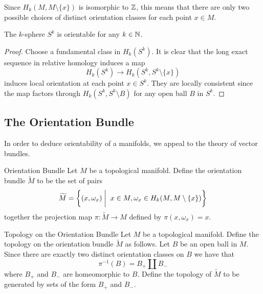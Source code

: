 \documentclass[a4paper]{article}
\begin{document}
Since $H_k(M,M\setminus\{x\})$ is isomorphic to $\mathbb{Z}$, this means that there are only two possible choices of distinct orientation classes for each point $x\in M$. 

\begin{lmm}{}{} The $k$-sphere $S^k$ is orientable for any $k\in\mathbb{N}$. \tcbline
\begin{proof}
Choose a fundamental class in $H_k(S^k)$. It is clear that the long exact sequence in relative homology induces a map $$H_k(S^k)\to H_k(S^k,S^k\setminus\{x\})$$ induces local orientation at each point $x\in S^k$. They are locally consistent since the map factors through $H_k(S^k,S^k\setminus B)$ for any open ball $B$ in $S^k$. 
\end{proof}
\end{lmm}

\subsection{The Orientation Bundle}
In order to deduce orientability of a manifolds, we appeal to the theory of vector bundles. 

\begin{defn}{Orientation Bundle}{} Let $M$ be a topological manifold. Define the orientation bundle $\widetilde{M}$ to be the set of pairs $$\widetilde{M}=\left\{(x,\omega_x)\;\bigg{|}\;\; x\in M, \omega_x\in H_k(M,M\setminus\{x\})\right\}$$ together the projection map $\pi:\widetilde{M}\to M$ defined by $\pi(x,\omega_x)=x$. 
\end{defn}

\begin{defn}{Topology on the Orientation Bundle}{} Let $M$ be a topological manifold. Define the topology on the orientation bundle $\widetilde{M}$ as follows. Let $B$ be an open ball in $M$. Since there are exactly two distinct orientation classes on $B$ we have that $$\pi^{-1}(B)=B_+\amalg B_-$$ where $B_+$ and $B_-$ are homeomorphic to $B$. Define the topology of $\widetilde{M}$ to be generated by sets of the form $B_+$ and $B_-$. 
\end{defn}
\end{document}
